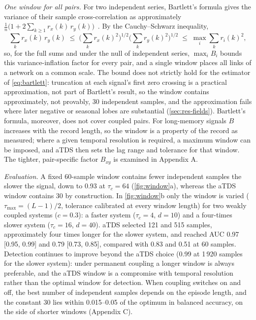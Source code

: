 \documentclass[11pt,a4paper]{article}
\begin{document}
\emph{One window for all pairs.} For two independent series, Bartlett's formula gives the variance of their sample cross-correlation as approximately $\frac{1}{n}\big(1 + 2\sum_{k\ge1} r_x(k)\,r_y(k)\big)$~\cite{Bartlett1946TheoreticalSpecification}. By the Cauchy--Schwarz inequality,
\begin{equation}
\textstyle\sum_k r_x(k)\,r_y(k) \;\le\; \big(\sum_k r_x(k)^2\big)^{1/2}\big(\sum_k r_y(k)^2\big)^{1/2} \;\le\; \max_i \sum_k r_i(k)^2 ,
\end{equation}
so, for the full sums and under the null of independent series, $\max_i B_i$ bounds this variance-inflation factor for every pair, and a single window places all links of a network on a common scale. The bound does not strictly hold for the estimator of \cref{eq:bartlett}: truncation at each signal's first zero crossing is a practical approximation, not part of Bartlett's result, so the window contains approximately, not provably, 30 independent samples, and the approximation fails where later negative or seasonal lobes are substantial (\cref{sec:res-fields}). Bartlett's formula, moreover, does not cover coupled pairs. For long-memory signals $B$ increases with the record length, so the window is a property of the record as measured; where a given temporal resolution is required, a maximum window can be imposed, and aTDS then sets the lag range and tolerance for that window. The tighter, pair-specific factor $B_{xy}$ is examined in Appendix A.

\emph{Evaluation.} A fixed 60-sample window contains fewer independent samples the slower the signal, down to 0.93 at $\tau_c = 64$ (\cref{fig:window}a), whereas the aTDS window contains 30 by construction. In \cref{fig:window}b only the window is varied ($\tau_{\max} = (L-1)/2$, tolerance calibrated at every window length) for two weakly coupled systems ($c = 0.3$): a faster system ($\tau_c = 4$, $d = 10$) and a four-times slower system ($\tau_c = 16$, $d = 40$). aTDS selected 121 and 515 samples, approximately four times longer for the slower system, and reached AUC 0.97 [0.95, 0.99] and 0.79 [0.73, 0.85], compared with 0.83 and 0.51 at 60 samples. Detection continues to improve beyond the aTDS choice (0.99 at 1\,920 samples for the slower system): under permanent coupling a longer window is always preferable, and the aTDS window is a compromise with temporal resolution rather than the optimal window for detection. When coupling switches on and off, the best number of independent samples depends on the episode length, and the constant 30 lies within 0.015--0.05 of the optimum in balanced accuracy, on the side of shorter windows (Appendix C).
\end{document}
